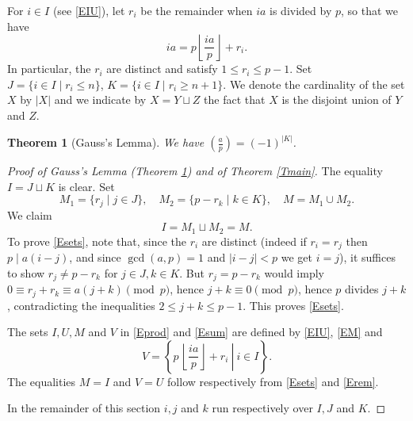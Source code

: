 \documentclass[12pt,letterpaper]{article}
\newtheorem{thm}{Theorem}%
\begin{document}
For \(i\in I\) (see \eqref{EIU}), let \(r_i\) be the remainder when \(ia\) is divided by \(p\), so that we have 
\begin{equation}\label{Erem} 
ia=p\left\lfloor\frac{ia}p\right\rfloor+r_i.
\end{equation} 
In particular, the \(r_i\) are distinct and satisfy \(1\le r_i\le p-1\). Set \(J=\{i\in I\mid r_i\le n\}\), \(K=\{i\in I\mid r_i\ge n+1\}\). We denote the cardinality of the set \(X\) by \(|X|\) and we indicate by \(X=Y\sqcup Z\) the fact that \(X\) is the disjoint union of \(Y\) and \(Z\). 

\begin{thm}[Gauss's Lemma]\label{TGL} 
We have \((\frac ap)=(-1)^{|K|}\). 
\end{thm} 

\begin{proof}[Proof of Gauss's Lemma (Theorem \ref{TGL}) and of Theorem \ref{Tmain}] 
The equality \(I=J\sqcup K\) is clear. Set 
\begin{equation}\label{EM}
M_1=\{r_j\mid j\in J\},\quad M_2=\{p-r_k\mid k\in K\},\quad M=M_1\cup M_2.
\end{equation} 
We claim 
\begin{equation}\label{Esets} 
I=M_1\sqcup M_2=M.
\end{equation} 
To prove \eqref{Esets}, note that, since the \(r_i\) are distinct (indeed if \(r_i=r_j\) then \(p\mid a(i-j)\), and since \(\gcd(a,p)=1\) and \(|i-j|<p\) we get \(i=j\)), it suffices to show \(r_j\ne p-r_k\) for \(j\in J,k\in K\). But \(r_j=p-r_k\) would imply \(0\equiv r_j+r_k\equiv a(j+k)\pmod{p}\), hence \(j+k\equiv0\pmod{p}\), hence \(p\) divides \(j+k\), contradicting the inequalities \(2\le j+k\le p-1\). This proves \eqref{Esets}. 

The sets \(I,U,M\) and \(V\) in \eqref{Eprod} and \eqref{Esum} are defined by \eqref{EIU}, \eqref{EM} and 
\begin{equation}\label{EV} 
V=\left\{\left.p\,\left\lfloor\frac{ia}p\right\rfloor+r_i\ \right|\ i\in I\right\}.
\end{equation} 
The equalities \(M=I\) and \(V=U\) follow respectively from \eqref{Esets} and \eqref{Erem}. 

In the remainder of this section \(i,j\) and \(k\) run respectively over \(I,J\) and \(K\). 


\end{proof}
\end{document}

